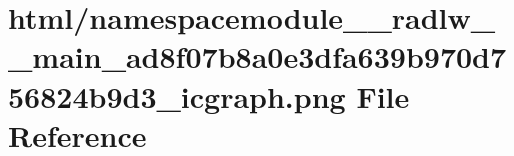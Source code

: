 \hypertarget{namespacemodule____radlw____main__ad8f07b8a0e3dfa639b970d756824b9d3__icgraph_8png}{}\section{html/namespacemodule\+\_\+\+\_\+radlw\+\_\+\+\_\+main\+\_\+ad8f07b8a0e3dfa639b970d756824b9d3\+\_\+icgraph.png File Reference}
\label{namespacemodule____radlw____main__ad8f07b8a0e3dfa639b970d756824b9d3__icgraph_8png}
